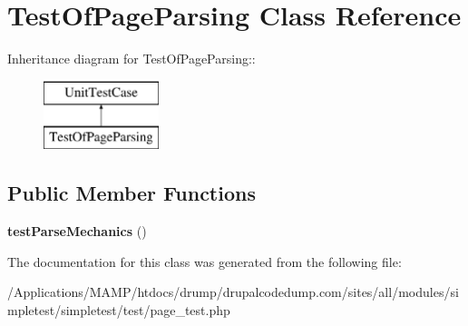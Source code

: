 \hypertarget{class_test_of_page_parsing}{
\section{TestOfPageParsing Class Reference}
\label{class_test_of_page_parsing}
}
Inheritance diagram for TestOfPageParsing::\begin{figure}[H]
\begin{center}
\leavevmode
\includegraphics[height=2cm]{class_test_of_page_parsing}
\end{center}
\end{figure}
\subsection*{Public Member Functions}
\begin{DoxyCompactItemize}
\item 
\hypertarget{class_test_of_page_parsing_acf05c8cb8a87920561391d1971e7ff4f}{
{\bfseries testParseMechanics} ()}
\label{class_test_of_page_parsing_acf05c8cb8a87920561391d1971e7ff4f}

\end{DoxyCompactItemize}


The documentation for this class was generated from the following file:\begin{DoxyCompactItemize}
\item 
/Applications/MAMP/htdocs/drump/drupalcodedump.com/sites/all/modules/simpletest/simpletest/test/page\_\-test.php\end{DoxyCompactItemize}

